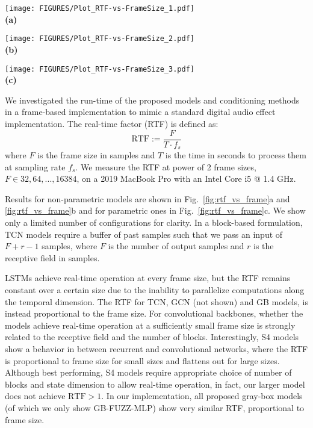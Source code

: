 \begin{figure*}[t]
    \begin{minipage}[b]{.33\textwidth}
        \centering
        \texttt{[image: FIGURES/Plot\_RTF-vs-FrameSize\_1.pdf]}
        \\\textbf{(a)}
    \end{minipage}
    \begin{minipage}[b]{.33\textwidth}
        \centering
        \texttt{[image: FIGURES/Plot\_RTF-vs-FrameSize\_2.pdf]}
        \\\textbf{(b)}
    \end{minipage}
    \begin{minipage}[b]{.33\textwidth}
        \centering
        \texttt{[image: FIGURES/Plot\_RTF-vs-FrameSize\_3.pdf]}
        \\\textbf{(c)}
    \end{minipage}
    \caption{Real-time factor vs. Frame size for some of the models included in the experiments}
    \label{fig:rtf_vs_frame}
\end{figure*}

We investigated the run-time of the proposed models and conditioning methods in a frame-based implementation to mimic a standard digital audio effect implementation. 
The real-time factor (RTF) is defined as:
\begin{equation}
    \text{RTF}:=\frac{F}{T \cdot f_{s}}
\end{equation}
where $F$ is the frame size in samples and $T$ is the time in seconds to process them at sampling rate $f_{s}$. 
We measure the RTF at power of 2 frame sizes, $F \in 32, 64, ..., 16384$, on a 2019 MacBook Pro with an Intel Core i5 @ 1.4 GHz.

Results for non-parametric models are shown in Fig.~\ref{fig:rtf_vs_frame}a and \ref{fig:rtf_vs_frame}b and for parametric ones in Fig.~\ref{fig:rtf_vs_frame}c.
We show only a limited number of configurations for clarity.
In a block-based formulation, TCN models require a buffer of past samples such that we pass an input of $F + r - 1$ samples, where $F$ is the number of output samples and $r$ is the receptive field in samples.

LSTMs achieve real-time operation at every frame size, but the RTF remains constant over a certain size due to the inability to parallelize computations along the temporal dimension.
The RTF for TCN, GCN (not shown) and GB models, is instead proportional to the frame size.
For convolutional backbones, whether the models achieve real-time operation at a sufficiently small frame size is strongly related to the receptive field and the number of blocks.
Interestingly, S4 models show a behavior in between recurrent and convolutional networks, where the RTF is proportional to frame size for small sizes and flattens out for large sizes.
Although best performing, S4 models require appropriate choice of number of blocks and state dimension to allow real-time operation, in fact, our larger model does not achieve $\text{RTF}> 1$.
In our implementation, all proposed gray-box models (of which we only show GB-FUZZ-MLP) show very similar RTF, proportional to frame size.

